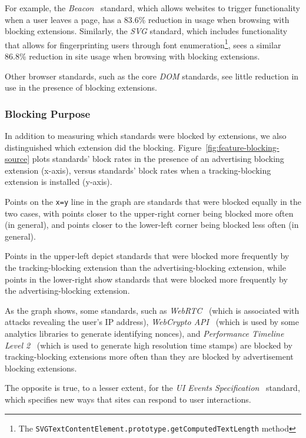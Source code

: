 For example, the \textit{Beacon}~\cite{beaconapi} standard, which allows
websites to trigger functionality when a user leaves a page, has a 83.6\%
reduction in usage when browsing with blocking extensions.  Similarly, the
\emph{SVG} standard, which includes functionality that allows for
fingerprinting users through font enumeration\footnote{The
\texttt{SVGTextContentElement.prototype.getComputedTextLength} method}, sees a
similar 86.8\% reduction in site usage when browsing with blocking extensions.

Other browser standards, such as the core \textit{DOM} standards, see little
reduction in use in the presence of blocking extensions.

\subsubsection{Blocking Purpose}



In addition to measuring which standards were blocked by extensions, we also
distinguished which extension did the blocking.
Figure~\ref{fig:feature-blocking-source} plots standards' block rates in the
presence of an advertising blocking extension (x-axis), versus standards' block
rates when a tracking-blocking extension is installed (y-axis).

Points on the \texttt{x=y} line in the graph are standards that were blocked
equally in the two cases, with points closer to the upper-right corner being
blocked more often (in general), and points closer to the lower-left corner
being blocked less often (in general).

Points in the upper-left depict standards that were blocked more frequently by
the tracking-blocking extension than the advertising-blocking extension, while
points in the lower-right show standards that were blocked more frequently by
the advertising-blocking extension.

As the graph shows, some standards, such as \emph{WebRTC}~\cite{webrtcw3c}
(which is associated with attacks revealing the user's IP address),
\emph{WebCrypto API}~\cite{webcryptow3c} (which is used by some analytics
libraries to generate identifying nonces), and \emph{Performance Timeline Level
2}~\cite{perftimingw3c} (which is used to generate high resolution time stamps)
are blocked by tracking-blocking extensions more often than they are blocked by
advertisement blocking extensions.

The opposite is true, to a lesser extent, for the \emph{UI Events
Specification}~\cite{uievents3c} standard, which specifies new ways that sites
can respond to user interactions.

